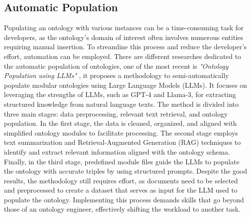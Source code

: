 \subsection{Automatic Population}
\label{subsection:4_3_7_automatic}
Populating an ontology with various instances can be a time-consuming task for developers, as the ontology's domain of interest often involves numerous entities requiring manual insertion. To streamline this process and reduce the developer's effort, automation can be employed. There are different researches dedicated to the automatic population of ontologies, one of the most recent is \textit{"Ontology Population using LLMs"} \cite{norouzi2024ontology}, it proposes a methodology to semi-automatically populate modular ontologies using Large Language Models (LLMs). It focuses on leveraging the strengths of LLMs, such as GPT-4 and Llama-3, for extracting structured knowledge from natural language texts. The method is divided into three main stages: data preprocessing, relevant text retrieval, and ontology population. In the first stage, the data is cleaned, organized, and aligned with simplified ontology modules to facilitate processing. The second stage employs text summarization and Retrieval-Augmented Generation (RAG) techniques to identify and extract relevant information aligned with the ontology schema. Finally, in the third stage, predefined module files guide the LLMs to populate the ontology with accurate triples by using structured prompts. Despite the good results, the methodology still requires effort, as documents need to be selected and preprocessed to create a dataset that serves as input for the LLM used to populate the ontology. Implementing this process demands skills that go beyond those of an ontology engineer, effectively shifting the workload to another task.\\ 
